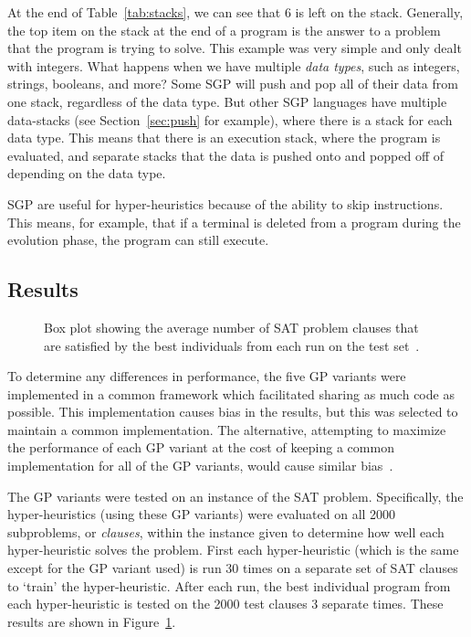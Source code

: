 \documentclass{sig-alternate}
\begin{document}
At the end of Table~\ref{tab:stacks}, we can see that 6 is left on the stack. Generally, the top item on the stack at the end of a program is the answer to a problem that the program is trying to solve. This example was very simple and only dealt with integers. What happens when we have multiple \textit{data types}, such as integers, strings, booleans, and more? Some SGP will push and pop all of their data from one stack, regardless of the data type. But other SGP languages have multiple data-stacks (see Section~\ref{sec:push} for example), where there is a stack for each data type. This means that there is an execution stack, where the program is evaluated, and separate stacks that the data is pushed onto and popped off of depending on the data type.

SGP are useful for hyper-heuristics because of the ability to skip instructions. This means, for example, that if a terminal is deleted from a program during the evolution phase, the program can still execute.

\subsection{Results}
\label{sec:gpresults}
\begin{figure}
	\centering
	\caption{Box plot showing the average number of SAT problem clauses that are satisfied by the best individuals from each run on the test set~\cite{harris:2015}.}
	\label{fig:gpvariants}
\end{figure}

To determine any differences in performance, the five GP variants were implemented in a common framework which facilitated sharing as much code as possible. This implementation causes bias in the results, but this was selected to maintain a common implementation. The alternative, attempting to maximize the performance of each GP variant at the cost of keeping a common implementation for all of the GP variants, would cause similar bias~\cite{harris:2015}.

The GP variants were tested on an instance of the SAT problem. Specifically, the hyper-heuristics (using these GP variants) were evaluated on all 2000 subproblems, or \textit{clauses}, within the instance given to determine how well each hyper-heuristic solves the problem. First each hyper-heuristic (which is the same except for the GP variant used) is run 30 times on a separate set of SAT clauses to `train' the hyper-heuristic. After each run, the best individual program from each hyper-heuristic is tested on the 2000 test clauses 3 separate times. These results are shown in Figure~\ref{fig:gpvariants}.
\end{document}
